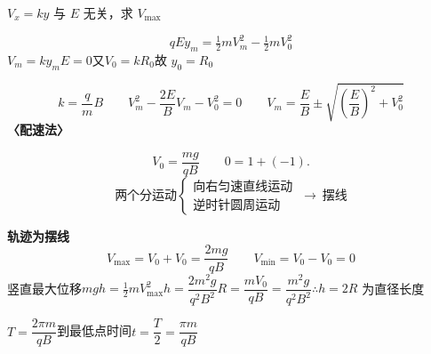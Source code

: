 $V_x=ky$ 与 $E$ 无关，求 $V_{\max}$

\[ qEy_m=\tfrac12mV_m^2-\tfrac12mV_0^2 \]
$V_m=ky_m$\quad {}$E=0$\quad 又$V_0=kR_0$\quad 故 \quad $y_0=R_0$

\[ k=\frac{q}{m}B\qquad V_m^2-\frac{2E}{B}V_m-V_0^2=0\qquad V_m=\frac{E}{B}\pm\sqrt{\left(\frac{E}{B}\right)^2+V_0^2} \]
\textbf{〈配速法〉}

\[ V_0=\frac{mg}{qB}\qquad 0=1+(-1). \]
\[ \text{两个分运动}\left\{\begin{array}{l}\text{向右匀速直线运动}\\ \text{逆时针圆周运动}\end{array}\right.\ \to\ \text{摆线} \]

\textbf{轨迹为摆线}
\[ V_{\max}=V_0+V_0=\frac{2mg}{qB}\qquad V_{\min}=V_0-V_0=0 \]
竖直最大位移\quad$mgh=\tfrac12mV_{\max}^2$\quad$h=\dfrac{2m^2g}{q^2B^2}$\quad$R=\dfrac{mV_0}{qB}=\dfrac{m^2g}{q^2B^2}$\quad$\therefore h=2R$ 为直径长度

$T=\dfrac{2\pi m}{qB}$\quad 到最低点时间\quad$t=\dfrac{T}{2}=\dfrac{\pi m}{qB}$

